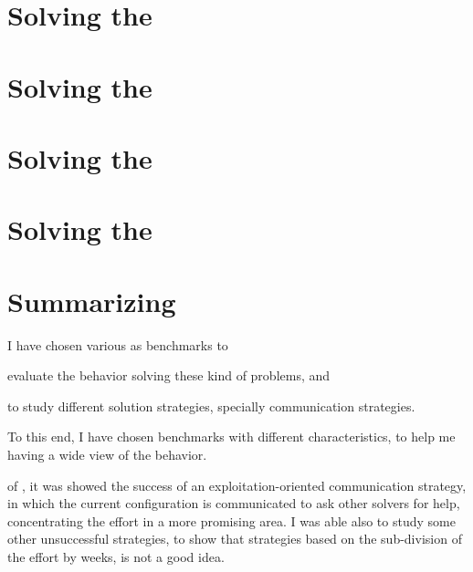 
\section{Solving the \sgp}
\label{sec:golfers}



\section{Solving the \nqp}
\label{sec:nqueens}



\section{Solving the \carrp}
\label{sec:costas}



\section{Solving the \grp}
\label{sec:golomb}



\section{Summarizing}

 I have chosen various \CSPs{} as benchmarks to \begin{inparaenum}[1.] \item evaluate the \posl{} behavior solving these kind of problems, and \item to study different solution strategies, specially communication strategies.\end{inparaenum} To this end, I have chosen benchmarks with different characteristics, to help me having a wide view of the \posl{} behavior.

 of \sgp{}, it was showed the success of an exploitation-oriented communication strategy, in which the current configuration is communicated to ask other solvers for help, concentrating the effort in a more promising area. I was able also to study some other unsuccessful strategies, to show that strategies based on the sub-division of the effort by weeks, is not a good idea.

